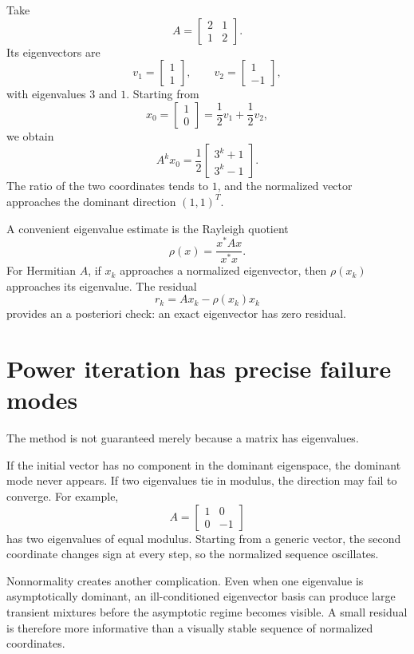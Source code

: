 Take
\[
  A=
  \begin{bmatrix}
    2&1\\
    1&2
  \end{bmatrix}.
\]
Its eigenvectors are
\[
  v_1=\begin{bmatrix}1\\1\end{bmatrix},
  \qquad
  v_2=\begin{bmatrix}1\\-1\end{bmatrix},
\]
with eigenvalues \(3\) and \(1\).  Starting from
\[
  x_0=\begin{bmatrix}1\\0\end{bmatrix}
  =\frac12v_1+\frac12v_2,
\]
we obtain
\[
  A^kx_0
  =\frac12
  \begin{bmatrix}
    3^k+1\\
    3^k-1
  \end{bmatrix}.
\]
The ratio of the two coordinates tends to \(1\), and the normalized vector approaches the dominant direction \((1,1)^T\).

A convenient eigenvalue estimate is the Rayleigh quotient
\[
  \rho(x)=\frac{x^*Ax}{x^*x}.
\]
For Hermitian \(A\), if \(x_k\) approaches a normalized eigenvector, then \(\rho(x_k)\) approaches its eigenvalue.  The residual
\[
  r_k=Ax_k-\rho(x_k)x_k
\]
provides an a posteriori check: an exact eigenvector has zero residual.

\section{Power iteration has precise failure modes}

The method is not guaranteed merely because a matrix has eigenvalues.

If the initial vector has no component in the dominant eigenspace, the dominant mode never appears.  If two eigenvalues tie in modulus, the direction may fail to converge.  For example,
\[
  A=
  \begin{bmatrix}
    1&0\\
    0&-1
  \end{bmatrix}
\]
has two eigenvalues of equal modulus.  Starting from a generic vector, the second coordinate changes sign at every step, so the normalized sequence oscillates.

Nonnormality creates another complication.  Even when one eigenvalue is asymptotically dominant, an ill-conditioned eigenvector basis can produce large transient mixtures before the asymptotic regime becomes visible.  A small residual is therefore more informative than a visually stable sequence of normalized coordinates.

